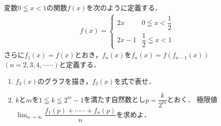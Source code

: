 \documentclass[../../main.tex]{subfiles}
\begin{document}
変数$0 \leqq x<1$の関数$f(x)$を次のように定義する．
\begin{align}
  f(x)=
  \begin{cases} 2x & 0 \leqq x < \dfrac{1}{2} \\ 2x-1 & \dfrac{1}{2} \leqq x < 1
  \end{cases}
\end{align}
さらに$f_1(x)=f(x)$とおき，$f_n(x)$を$f_n(x)=f(f_{n-1}(x))$ $(n=2,3,4,\cdots\cdots)$と定義する．
\begin{enumerate}
  \item $f_3(x)$のグラフを描き，$f_3(x)$を式で表せ．
  \item $k$と$m$を$1 \leqq k \leqq 2^m - 1$を満たす自然数とし$\displaystyle p = \dfrac{k}{2^m}$とおく．
    極限値$\displaystyle\lim_{n\to\infty}\dfrac{f_1(p)+\cdots\cdots+f_n(p)}{n}$を求めよ．
\end{enumerate}
\end{document}
